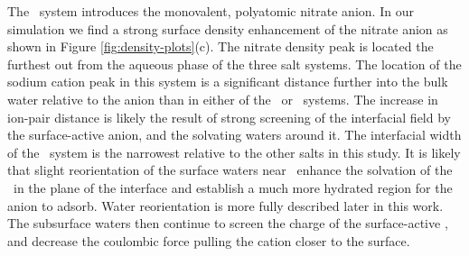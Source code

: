 The \sodnit~system introduces the monovalent, polyatomic nitrate anion. In our simulation we find a strong surface density enhancement of the nitrate anion as shown in Figure \ref{fig:density-plots}(c). The nitrate density peak is located the furthest out from the aqueous phase of the three salt systems. The location of the sodium cation peak in this system is a significant distance further into the bulk water relative to the anion than in either of the \nacl~or \sodsul~systems. The increase in ion-pair distance is likely the result of strong screening of the interfacial field by the surface-active anion, and the solvating waters around it. The interfacial width of the \sodnit~system is the narrowest relative to the other salts in this study. It is likely that slight reorientation of the surface waters near \ctc~enhance the solvation of the \nit~in the plane of the interface and establish a much more hydrated region for the anion to adsorb. Water reorientation is more fully described later in this work. The subsurface waters then continue to screen the charge of the surface-active \nit, and decrease the coulombic force pulling the cation closer to the surface. 



